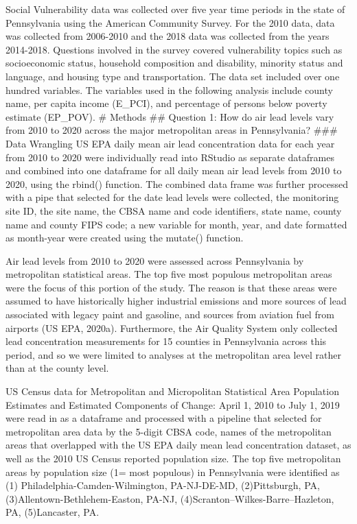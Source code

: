 \documentclass[
  12pt,
]{article}
\begin{document}
Social Vulnerability data was collected over five year time periods in
the state of Pennsylvania using the American Community Survey. For the
2010 data, data was collected from 2006-2010 and the 2018 data was
collected from the years 2014-2018. Questions involved in the survey
covered vulnerability topics such as socioeconomic status, household
composition and disability, minority status and language, and housing
type and transportation. The data set included over one hundred
variables. The variables used in the following analysis include county
name, per capita income (E\_PCI), and percentage of persons below
poverty estimate (EP\_POV). \newpage \# Methods \#\# Question 1: How do
air lead levels vary from 2010 to 2020 across the major metropolitan
areas in Pennsylvania? \#\#\# Data Wrangling US EPA daily mean air lead
concentration data for each year from 2010 to 2020 were individually
read into RStudio as separate dataframes and combined into one dataframe
for all daily mean air lead levels from 2010 to 2020, using the rbind()
function. The combined data frame was further processed with a pipe that
selected for the date lead levels were collected, the monitoring site
ID, the site name, the CBSA name and code identifiers, state name,
county name and county FIPS code; a new variable for month, year, and
date formatted as month-year were created using the mutate() function.

Air lead levels from 2010 to 2020 were assessed across Pennsylvania by
metropolitan statistical areas. The top five most populous metropolitan
areas were the focus of this portion of the study. The reason is that
these areas were assumed to have historically higher industrial
emissions and more sources of lead associated with legacy paint and
gasoline, and sources from aviation fuel from airports (US EPA, 2020a).
Furthermore, the Air Quality System only collected lead concentration
measurements for 15 counties in Pennsylvania across this period, and so
we were limited to analyses at the metropolitan area level rather than
at the county level.

US Census data for Metropolitan and Micropolitan Statistical Area
Population Estimates and Estimated Components of Change: April 1, 2010
to July 1, 2019 were read in as a dataframe and processed with a
pipeline that selected for metropolitan area data by the 5-digit CBSA
code, names of the metropolitan areas that overlapped with the US EPA
daily mean lead concentration dataset, as well as the 2010 US Census
reported population size. The top five metropolitan areas by population
size (1= most populous) in Pennsylvania were identified as (1)
Philadelphia-Camden-Wilmington, PA-NJ-DE-MD, (2)Pittsburgh, PA,
(3)Allentown-Bethlehem-Easton, PA-NJ,
(4)Scranton--Wilkes-Barre--Hazleton, PA, (5)Lancaster, PA.
\end{document}
